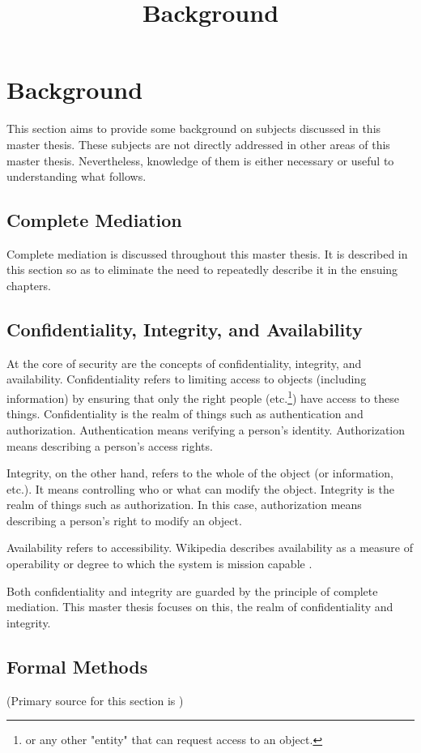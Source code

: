 \documentclass[../../main/main.tex]{subfiles}
\begin{document}
\title{Background}

\chapter{Background}
This section aims to provide some background on subjects discussed in this master thesis.  These subjects are not directly addressed in other areas of this master thesis.  Nevertheless, knowledge of them is either necessary or useful to understanding what follows.

\section{Complete Mediation}
Complete mediation is discussed throughout this master thesis.  It is described in this section so as to eliminate the need to repeatedly describe it in the ensuing chapters.

\section{Confidentiality, Integrity, and Availability}
At the core of security are the concepts of confidentiality, integrity, and availability.  Confidentiality refers to limiting access to objects (including information) by ensuring that only the right people (etc.\footnote{or any other "entity" that can request access to an object.}) have access to these things.  Confidentiality is the realm of things such as authentication and authorization.  Authentication means verifying a person's identity.  Authorization means describing a person's access rights. 

Integrity, on the other hand, refers to the whole of the object (or information, etc.).  It means controlling who or what can modify the object.   Integrity is the realm of things such as authorization.  In this case, authorization means describing a person's right to modify an object.  

Availability refers to accessibility.  Wikipedia describes availability as a measure of operability or degree to which the system is mission capable \cite {availability}. 

Both confidentiality and integrity are guarded by the principle of complete mediation.  This master thesis focuses on this, the realm of confidentiality and integrity.

\section{Formal Methods}
(Primary source for this section is \cite{formalCarnegie})
\end{document}
